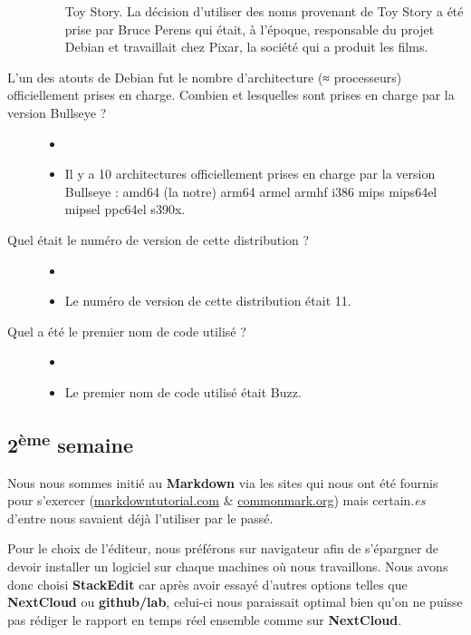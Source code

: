 \documentclass{report}
\begin{document}
\begin{description}
\begin{itemize}
  Toy Story. La décision d'utiliser des noms provenant de Toy Story a
  été prise par Bruce Perens qui était, à l'époque, responsable du
  projet Debian et travaillait chez Pixar, la société qui a produit les
  films.
\end{itemize}
\item[L'un des atouts de Debian fut le nombre d'architecture (≈
processeurs) officiellement prises en charge. Combien et lesquelles sont
prises en charge par la version Bullseye ?]
\begin{itemize}
\tightlist
\item[]
\item
  Il y a 10 architectures officiellement prises en charge par la version
  Bullseye : amd64 (la notre) arm64 armel armhf i386 mips mips64el
  mipsel ppc64el s390x.
\end{itemize}
\item[Quel était le numéro de version de cette distribution ?]
\begin{itemize}
\tightlist
\item[]
\item
  Le numéro de version de cette distribution était 11.
\end{itemize}
\item[Quel a été le premier nom de code utilisé ?]
\begin{itemize}
\tightlist
\item[]
\item
  Le premier nom de code utilisé était Buzz.
\end{itemize}
\end{description}

\subsection{\texorpdfstring{2\textsuperscript{ème}
semaine}{2ème semaine}}\label{2S}

Nous nous sommes initié au \textbf{Markdown} via les sites qui nous ont
été fournis pour s'exercer
(\href{http://markdowntutorial.com}{markdowntutorial.com} \&
\href{http://commonmark.org}{commonmark.org}) mais certain.\emph{es}
d'entre nous savaient déjà l'utiliser par le passé.

Pour le choix de l'éditeur, nous préférons sur navigateur afin de
s'épargner de devoir installer un logiciel sur chaque machines où nous
travaillons. Nous avons donc choisi \textbf{StackEdit} car après avoir
essayé d'autres options telles que \textbf{NextCloud} ou
\textbf{github/lab}, celui-ci nous paraissait optimal bien qu'on ne
puisse pas rédiger le rapport en temps réel ensemble comme sur
\textbf{NextCloud}.
\end{document}
